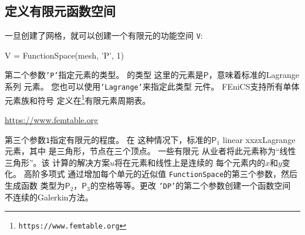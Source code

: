 
\subsection{定义有限元函数空间}

一旦创建了网格，就可以创建一个有限元的功能空间
\texttt{V}:

\begin{bash}
V = FunctionSpace(mesh, 'P', 1)
\end{bash}

第二个参数\texttt{'P'}指定元素的类型。 的类型
这里的元素是$\mathsf{P}$，意味着标准的Lagrange系列
元素。 您也可以使用\texttt{'Lagrange'}来指定此类型
元件。 FEniCS支持所有单体元素族和符号
定义在\footnote{\texttt{https://www.femtable.org}}{有限元素周期表}\cite{ArnoldLogg2014}。
\begin{center}
  \url{https://www.femtable.org}
\end{center}


第三个参数\texttt{1}指定有限元的程度。 在
这种情况下，标准的$\mathsf{P}_1$ linear xxzxLagrange元素，其中
是三角形，节点在三个顶点。 一些有限元
从业者将此元素称为“线性三角形”。该
计算的解决方案$u$将在元素和线性上是连续的
每个元素内的$x$和$y$变化。 高阶多项式
通过增加每个单元的近似值
\texttt{FunctionSpace}的第三个参数，然后生成函数
类型为$\mathsf{P}_2$，$\mathsf{P}_3$的空格等等。更改
\texttt{'DP'}的第二个参数创建一个函数空间
不连续的Galerkin方法。

 

